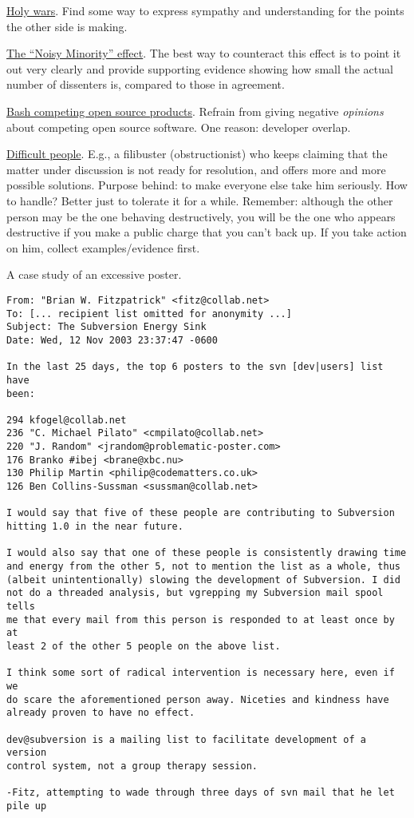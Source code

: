 \documentclass[landscape,30pt]{foils}
\begin{document}
\underline{Holy wars}.   Find some way to express sympathy and understanding for the points the other side is making.

\underline{The ``Noisy Minority'' effect}.  The best way to counteract this effect is to point it out very clearly and provide supporting evidence showing how small the actual number of dissenters is, compared to those in agreement.

\underline{Bash competing open source products}. Refrain from giving negative {\em opinions} about competing open source software. One reason: developer overlap.

\underline{Difficult people}.  E.g., a filibuster (obstructionist) who keeps claiming that the matter under discussion is not ready for resolution, and offers more and more possible solutions. Purpose behind: to make everyone else take him seriously.  How to handle? Better just to tolerate it for a while.  Remember: although the other person may be the one behaving destructively, you will be the one who appears destructive if you make a public charge that you can't back up.  If you take action on him, collect examples/evidence first.

\newpage
A case study of an excessive poster.

{\tiny
\begin{verbatim}
From: "Brian W. Fitzpatrick" <fitz@collab.net>
To: [... recipient list omitted for anonymity ...]
Subject: The Subversion Energy Sink
Date: Wed, 12 Nov 2003 23:37:47 -0600

In the last 25 days, the top 6 posters to the svn [dev|users] list have
been:

294 kfogel@collab.net
236 "C. Michael Pilato" <cmpilato@collab.net>
220 "J. Random" <jrandom@problematic-poster.com>
176 Branko #ibej <brane@xbc.nu>
130 Philip Martin <philip@codematters.co.uk>
126 Ben Collins-Sussman <sussman@collab.net>

I would say that five of these people are contributing to Subversion
hitting 1.0 in the near future.

I would also say that one of these people is consistently drawing time
and energy from the other 5, not to mention the list as a whole, thus
(albeit unintentionally) slowing the development of Subversion. I did
not do a threaded analysis, but vgrepping my Subversion mail spool tells
me that every mail from this person is responded to at least once by at
least 2 of the other 5 people on the above list.

I think some sort of radical intervention is necessary here, even if we
do scare the aforementioned person away. Niceties and kindness have
already proven to have no effect.

dev@subversion is a mailing list to facilitate development of a version
control system, not a group therapy session.

-Fitz, attempting to wade through three days of svn mail that he let
pile up
\end{verbatim}
}
\end{document}
